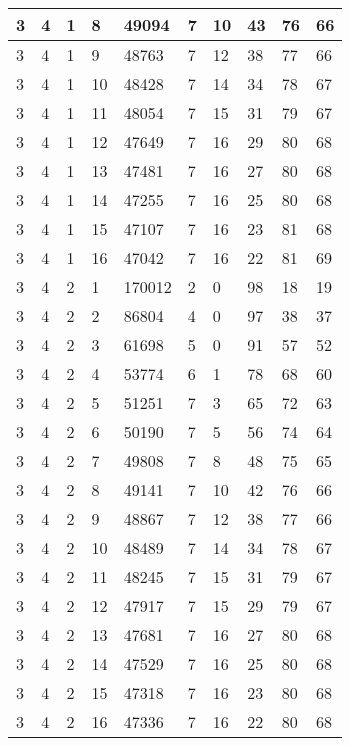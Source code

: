 \begin{table}[!ht]
\begin{tabular}{|l|l|l|l|l|l|l|l|l|l|}
        3 & 4 & 1 & 8 & 49094 & 7 & 10 & 43 & 76 & 66 \\ \hline
        3 & 4 & 1 & 9 & 48763 & 7 & 12 & 38 & 77 & 66 \\ \hline
        3 & 4 & 1 & 10 & 48428 & 7 & 14 & 34 & 78 & 67 \\ \hline
        3 & 4 & 1 & 11 & 48054 & 7 & 15 & 31 & 79 & 67 \\ \hline
        3 & 4 & 1 & 12 & 47649 & 7 & 16 & 29 & 80 & 68 \\ \hline
        3 & 4 & 1 & 13 & 47481 & 7 & 16 & 27 & 80 & 68 \\ \hline
        3 & 4 & 1 & 14 & 47255 & 7 & 16 & 25 & 80 & 68 \\ \hline
        3 & 4 & 1 & 15 & 47107 & 7 & 16 & 23 & 81 & 68 \\ \hline
        3 & 4 & 1 & 16 & 47042 & 7 & 16 & 22 & 81 & 69 \\ \hline
        3 & 4 & 2 & 1 & 170012 & 2 & 0 & 98 & 18 & 19 \\ \hline
        3 & 4 & 2 & 2 & 86804 & 4 & 0 & 97 & 38 & 37 \\ \hline
        3 & 4 & 2 & 3 & 61698 & 5 & 0 & 91 & 57 & 52 \\ \hline
        3 & 4 & 2 & 4 & 53774 & 6 & 1 & 78 & 68 & 60 \\ \hline
        3 & 4 & 2 & 5 & 51251 & 7 & 3 & 65 & 72 & 63 \\ \hline
        3 & 4 & 2 & 6 & 50190 & 7 & 5 & 56 & 74 & 64 \\ \hline
        3 & 4 & 2 & 7 & 49808 & 7 & 8 & 48 & 75 & 65 \\ \hline
        3 & 4 & 2 & 8 & 49141 & 7 & 10 & 42 & 76 & 66 \\ \hline
        3 & 4 & 2 & 9 & 48867 & 7 & 12 & 38 & 77 & 66 \\ \hline
        3 & 4 & 2 & 10 & 48489 & 7 & 14 & 34 & 78 & 67 \\ \hline
        3 & 4 & 2 & 11 & 48245 & 7 & 15 & 31 & 79 & 67 \\ \hline
        3 & 4 & 2 & 12 & 47917 & 7 & 15 & 29 & 79 & 67 \\ \hline
        3 & 4 & 2 & 13 & 47681 & 7 & 16 & 27 & 80 & 68 \\ \hline
        3 & 4 & 2 & 14 & 47529 & 7 & 16 & 25 & 80 & 68 \\ \hline
        3 & 4 & 2 & 15 & 47318 & 7 & 16 & 23 & 80 & 68 \\ \hline
        3 & 4 & 2 & 16 & 47336 & 7 & 16 & 22 & 80 & 68 \\ \hline

\end{tabular}
\end{table}
